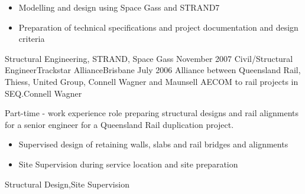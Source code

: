 \begin{experiences}
{        \begin{itemize}
		\item Modelling and design using Space Gass and STRAND7
		\item Preparation of technical specifications and project documentation and design criteria
               \end{itemize}
                    }
                    {Structural Engineering, STRAND, Space Gass} 
  \emptySeparator   
  \consultantexperience
  {November 2007}    {Civil/Structural Engineer}{Trackstar Alliance}{Brisbane}
  {July 2006}       {Alliance between Queensland Rail, Thiess, United Group, Connell Wagner and Maunsell AECOM to rail projects in SEQ.}{Connell Wagner}
  		{Part-time - work experience role preparing structural designs and rail alignments for a senior engineer for a Queensland Rail duplication project.                 
                      \begin{itemize}
		\item Supervised design of retaining walls, slabs and rail bridges and alignments
		\item Site Supervision during service location and site preparation
                      \end{itemize}
                    }
                    {Structural Design,Site Supervision}   
  \emptySeparator            
\end{experiences}
